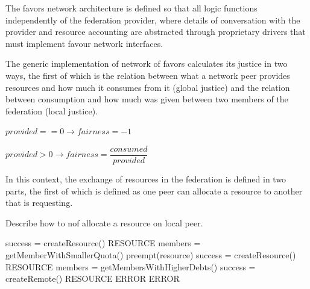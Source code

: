 \documentclass[acmsmall]{acmart}
\begin{document}
The favors network architecture is defined so that all logic functions independently of the federation provider, where details of conversation with the provider and resource accounting are abstracted through proprietary drivers that must implement favour network interfaces.

The generic implementation of network of favors calculates its justice in two ways, the first of which is the relation between what a network peer provides resources and how much it consumes from it (global justice) and the relation between consumption and how much was given between two members of the federation (local justice).

\begin{math}
    provided == 0 \rightarrow fairness = -1
\end{math}


\begin{math}
    provided > 0 \rightarrow fairness = \dfrac{consumed}{provided}
\end{math}

In this context, the exchange of resources in the federation is defined in two parts, the first of which is defined as one peer can allocate a resource to another that is requesting.

\begin{algorithm}
\caption{Describe how to nof allocate a resource on local peer.}
\begin{algorithmic}
        \STATE success = createResource()
            \RETURN RESOURCE
        \ELSE
            \STATE members = getMemberWithSmallerQuota()
                    \STATE preempt(resource)
                    \STATE success = createResource()
                        \RETURN RESOURCE
                    \ENDIF
                \ENDFOR
            \ENDFOR
            \STATE members = getMembersWithHigherDebts()
                \STATE success = createRemote()
                    \RETURN RESOURCE
                \ENDIF
            \ENDFOR
            \RETURN ERROR
        \ENDIF
    \ELSE
        \RETURN ERROR
    \ENDIF
\end{algorithmic}
\end{algorithm}
\end{document}
